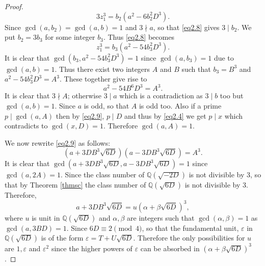 \documentclass[10pt,a4paper]{amsart}
\begin{document}
\begin{proof}
\begin{equation}\label{eq2.8}
3z_1^3=b_2(a^2-6b_2^2D^3).
\end{equation}
Since $\gcd(a, b_2)=\gcd(a,b)=1$ and $3\nmid a$, so that \eqref{eq2.8} gives $3\mid b_2$. We put $b_2=3b_3$ for some integer $b_3$. Thus \eqref{eq2.8} becomes
\begin{equation*}%
z_1^3=b_3(a^2-54b_3^2D^3).
\end{equation*}
It is clear that $\gcd(b_3, a^2-54b_3^2D^3)=1$ since $\gcd(a,b_3)=1$ due to $\gcd(a,b)=1$. Thus there exist two integers $A$ and $B$ such that $b_3=B^3$ and $a^2-54b_3^2D^3=A^3$. These together give rise to 
\begin{equation}\label{eq2.9}
a^2-54B^6D^3=A^3.
\end{equation} 
It is clear that $3\nmid A$; otherwise $3\mid a$ which is a contradiction as $3\mid b$ too but $\gcd(a,b)=1$. Since $a$ is odd, so that $A$ is odd too. Also if a prime $p\mid \gcd(a,A)$ then by \eqref{eq2.9}, $p\mid D$ and thus by \eqref{eq2.4} we get $p\mid x$ which contradicts to $\gcd(x, D)=1$. Therefore $\gcd(a, A)=1$.

We now rewrite \eqref{eq2.9} as follows:
$$\left(a+3DB^3\sqrt{6D}\right)\left(a-3DB^3\sqrt{6D}\right)=A^3.$$
It is clear that $\gcd\left(a+3DB^3\sqrt{6D},a-3DB^3\sqrt{6D}\right)=1$ since $\gcd(a,2A)=1$.
Since the class number of $\mathbb{Q}(\sqrt{-2D})$ is not divisible by $3$, so that by 
Theorem \ref{thmsc} the class number of $\mathbb{Q}(\sqrt{6D})$ is not divisible by $3$. Therefore, 
\begin{equation}\label{eq2.10}
a+3DB^3\sqrt{6D}=u\left(\alpha+\beta\sqrt{6D}\right)^3,
\end{equation}
where $u$ is unit in $\mathbb{Q}(\sqrt{6D})$ and $\alpha, \beta$ are integers such that $\gcd(\alpha, \beta)=1$ as $\gcd(a, 3BD)=1$. Since $6D\equiv 2\pmod 4$, so that the fundamental unit, $\varepsilon$ in $\mathbb{Q}(\sqrt{6D})$ is of the form $ \varepsilon=T+U\sqrt{6D}$. Therefore the only possibilities for $u$ are $1, \varepsilon$ and $\varepsilon^2$ since the higher powers of $\varepsilon$ can be  absorbed in $(\alpha+\beta\sqrt{6D})^3$. 


\end{proof}
\end{document}
